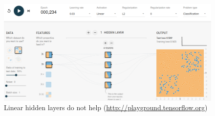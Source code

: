 \documentclass[12pt,aspectratio=169,handout]{beamer}
\begin{document}
\begin{frame}
	\begin{figure}
		\vspace{-1.3em}
		\includegraphics[width=1.35\linewidth]{img/linear3.png}	
		\caption{Linear hidden layers do not help (\url{http://playground.tensorflow.org})}
	\end{figure}	
\end{frame}
\end{document}
